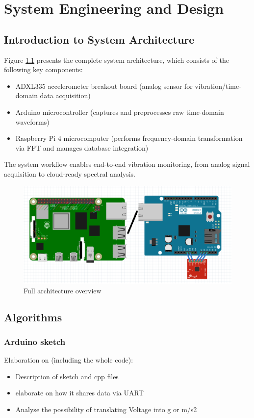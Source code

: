 \chapter{System Engineering and Design}
\label{chap3}

\section{Introduction to System Architecture}
{
Figure \ref{fig:System} presents the complete system architecture, which consists of the following key components:

\begin{itemize}
\item ADXL335 accelerometer breakout board (analog sensor for vibration/time-domain data acquisition)
\item Arduino microcontroller (captures and preprocesses raw time-domain waveforms)
\item Raspberry Pi 4 microcomputer (performs frequency-domain transformation via FFT and manages database integration)
\end{itemize}

The system workflow enables end-to-end vibration monitoring, from analog signal acquisition to cloud-ready spectral analysis.

\begin{figure}[h]
\centering
\includegraphics[width=\linewidth]{figures/System.png}
\caption{Full architecture overview}
\label{fig:System}
\end{figure}
}

\section{Algorithms}
\subsection{Arduino sketch}
{
Elaboration on (including the whole code):
\begin{itemize}
\item Description of sketch and cpp files
\item elaborate on how it shares data via UART
\item Analyse the possibility of translating Voltage into g or m/s2
\end{itemize}
}

